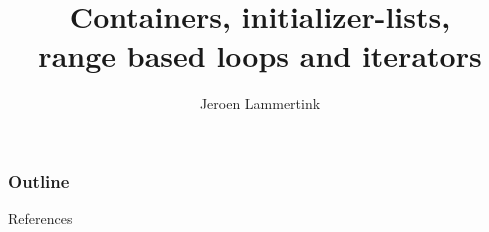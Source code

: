 \newcommand*{\BEAMERCLASS}{}


\title{Containers, initializer-lists,\\ range based loops and iterators}
\author{Jeroen Lammertink}
\begin{frame}
\titlepage
\end{frame}
\begin{frame}
\frametitle{Outline}
\tableofcontents[pausesections]
\end{frame}



\begin{frame}{References}
\printbibliography
\end{frame}
